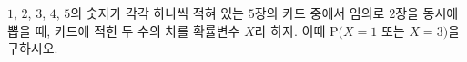 $1$, $2$, $3$, $4$, $5$의 숫자가 각각 하나씩 적혀 있는 $5$장의 카드 중에서 임의로 $2$장을 동시에 뽑을 때, 카드에 적힌 두 수의 차를 확률변수 $X$라 하자. 이때 $\mathrm{P}(X=1$ 또는 $X=3)$을 구하시오.
